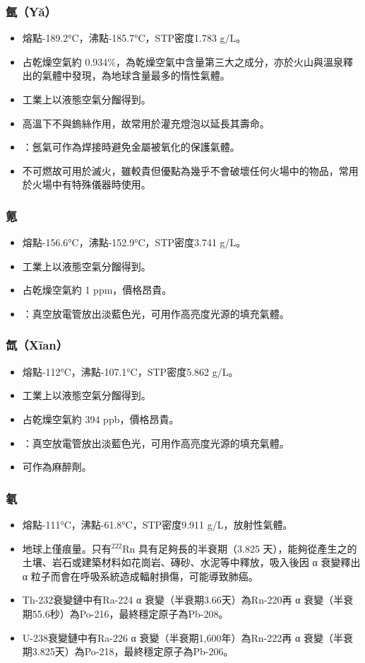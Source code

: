 \documentclass[a4paper,12pt]{report}
\begin{document}
\begin{itemize}
\begin{itemize}
\subsubsection{氬（Yă）}
\begin{itemize}
\item 熔點-189.2°C，沸點-185.7°C，STP密度1.783 g/L。
\item 占乾燥空氣約 0.934\%，為乾燥空氣中含量第三大之成分，亦於火山與溫泉釋出的氣體中發現，為地球含量最多的惰性氣體。
\item 工業上以液態空氣分餾得到。
\item 高溫下不與鎢絲作用，故常用於灌充燈泡以延長其壽命。
\item {}：氬氣可作為焊接時避免金屬被氧化的保護氣體。
\item 不可燃故可用於滅火，雖較貴但優點為幾乎不會破壞任何火場中的物品，常用於火場中有特殊儀器時使用。
\end{itemize}
\subsubsection{氪}
\begin{itemize}
\item 熔點-156.6°C，沸點-152.9°C，STP密度3.741 g/L。
\item 工業上以液態空氣分餾得到。
\item 占乾燥空氣約 1 ppm，價格昂貴。
\item {}：真空放電管放出淡藍色光，可用作高亮度光源的填充氣體。
\end{itemize}
\subsubsection{氙（Xīan）}
\begin{itemize}
\item 熔點-112°C，沸點-107.1°C，STP密度5.862 g/L。
\item 工業上以液態空氣分餾得到。
\item 占乾燥空氣約 394 ppb，價格昂貴。
\item {}：真空放電管放出淡藍色光，可用作高亮度光源的填充氣體。
\item 可作為麻醉劑。
\end{itemize}
\subsubsection{氡}
\begin{itemize}
\item 熔點-111°C，沸點-61.8°C，STP密度9.911 g/L，放射性氣體。
\item 地球上僅痕量。只有$^{222}$Rn 具有足夠長的半衰期（3.825 天），能夠從產生之的土壤、岩石或建築材料如花崗岩、磚砂、水泥等中釋放，吸入後因 α 衰變釋出 α 粒子而會在呼吸系統造成輻射損傷，可能導致肺癌。
\item Th-232衰變鏈中有Ra-224 α 衰變（半衰期3.66天）為Rn-220再 α 衰變（半衰期55.6秒）為Po-216，最終穩定原子為Pb-208。
\item U-238衰變鏈中有Ra-226 α 衰變（半衰期1,600年）為Rn-222再 α 衰變（半衰期3.825天）為Po-218，最終穩定原子為Pb-206。
\end{itemize}

\end{itemize}
\end{itemize}
\end{document}
